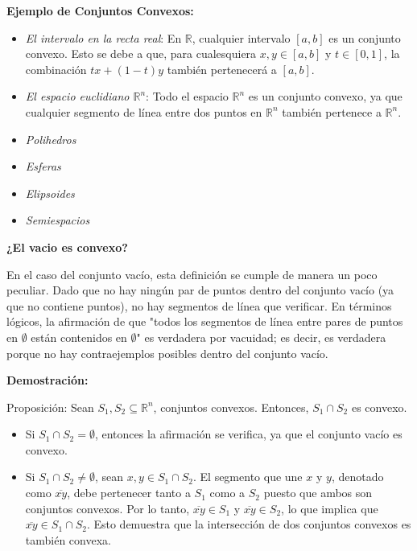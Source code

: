 \documentclass{article}
\begin{document}
\textbf{Ejemplo de Conjuntos Convexos:}
\begin{itemize}
    \item \textit{El intervalo en la recta real}: En \( \mathbb{R} \), cualquier intervalo \([a, b]\) es un conjunto convexo. Esto se debe a que, para cualesquiera \( x, y \in [a, b] \) y \( t \in [0,1] \), la combinación \( tx + (1-t)y \) también pertenecerá a \([a, b]\).

    \item \textit{El espacio euclidiano \( \mathbb{R}^n \)}: Todo el espacio \( \mathbb{R}^n \) es un conjunto convexo, ya que cualquier segmento de línea entre dos puntos en \( \mathbb{R}^n \) también pertenece a \( \mathbb{R}^n \).

    \item \textit{Polihedros}

    \item \textit{Esferas}

    \item \textit{Elipsoides}

    \item \textit{Semiespacios}
\end{itemize}

\textbf{¿El vacio es convexo?}

En el caso del conjunto vacío, esta definición se cumple de manera un poco peculiar. Dado que no hay ningún par de puntos dentro del conjunto vacío (ya que no contiene puntos), no hay segmentos de línea que verificar. En términos lógicos, la afirmación de que "todos los segmentos de línea entre pares de puntos en \(\emptyset\) están contenidos en \(\emptyset\)" es verdadera por vacuidad; es decir, es verdadera porque no hay contraejemplos posibles dentro del conjunto vacío.

\vspace{.25cm}

\textbf{Demostración:}

Proposición: Sean \(S_1, S_2 \subseteq \mathbb{R}^n\), conjuntos convexos. Entonces, \(S_1 \cap S_2\) es convexo.

\begin{itemize}
    \item Si \(S_1 \cap S_2 = \emptyset\), entonces la afirmación se verifica, ya que el conjunto vacío es convexo.
    \item Si \(S_1 \cap S_2 \neq \emptyset\), sean \(x, y \in S_1 \cap S_2\). El segmento que une \(x\) y \(y\), denotado como \(\overline{xy}\), debe pertenecer tanto a \(S_1\) como a \(S_2\) puesto que ambos son conjuntos convexos. Por lo tanto, \(\overline{xy} \in S_1\) y \(\overline{xy} \in S_2\), lo que implica que \(\overline{xy} \in S_1 \cap S_2\). Esto demuestra que la intersección de dos conjuntos convexos es también convexa.
\end{itemize}
\end{document}
